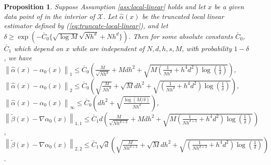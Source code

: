 \documentclass[11pt]{article}
\newtheorem{proposition}{Proposition}
\newcommand{\norm}[1]{\left\lVert #1 \right\rVert}
\begin{document}
\begin{proposition}\label{prop:concentration:covariate}
Suppose Assumption \ref{ass:local-linear} holds and let $x$ be a given data point of in the interior of $\mathcal{X}$. Let $\hat{\alpha}(x)$ be the truncated local linear estimator defined by (\ref{eq:truncate-local-linear}), and let 
$\delta\geq\exp(-\bar{C}_0\{\sqrt{\log M}\sqrt{Nh^d}+Nh^d\})$. Then for some absolute constants $\bar{C}_0$, $\bar{C}_1$ which depend on $x$ while are independent of $N,d,h,s,M$, with probability $1-\delta$, we have\\ $\norm{\hat{\alpha}(x)-\alpha_0(x)}_1\leq\bar{C}_0\left(\frac{M}{\sqrt{Nh^d}}+Mdh^2+\sqrt{M\left(\frac{1}{Nh^d}+h^4d^2\right)\log(\frac{1}{\delta})}\right)$, \\
$\norm{\hat{\alpha}(x)-\alpha_0(x)}_2\!\leq\!\bar{C}_0\left(\sqrt{\frac{M}{Nh^d}}+\sqrt{M}dh^2+\sqrt{\left(\frac{1}{Nh^d}+h^4d^2\right)\log(\frac{1}{\delta})}\right)$, \\
$\norm{\hat{\alpha}(x)-\alpha_{0}(x)}_{\infty}\leq\bar{C}_0\left(dh^2+\sqrt{\frac{\log(M/\delta)}{Nh^d}}\right)$, \\
$\norm{\tilde{\beta}(x)-\nabla\alpha_0(x)}_{1,1}\leq\bar{C}_1d\left(\frac{M}{\sqrt{Nh^{d+2}}}+\!\!Mdh^2\!\!+\!\!\sqrt{M\left(\frac{1}{Nh^{d+2}}+h^4d^2\right)\log(\frac{1}{\delta})}\right)$,\\
$\norm{\tilde{\beta}(x)-\nabla\alpha_0(x)}_{2,2}\leq\bar{C}_1\sqrt{d}\left(\sqrt{\frac{M}{Nh^{d+2}}}+\sqrt{M}dh^2+\!\!\sqrt{\left(\frac{1}{Nh^{d+2}}+h^4d^2\right)\log(\frac{1}{\delta})}\right)$.
\end{proposition}
\end{document}
